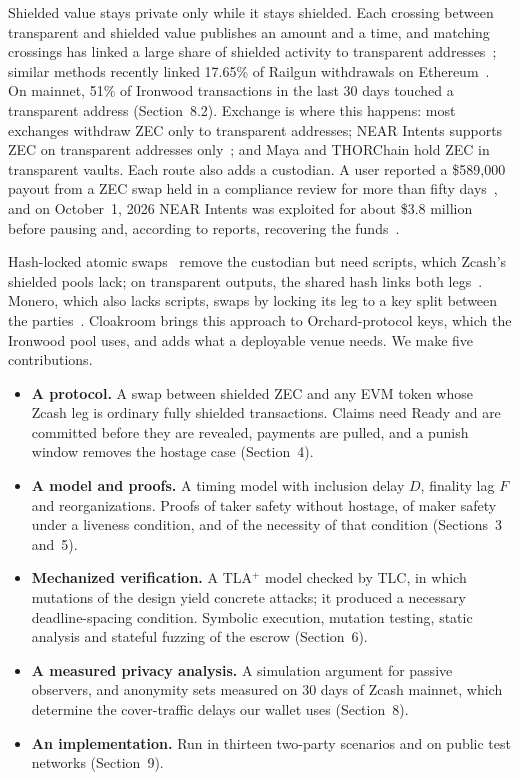 \documentclass[10pt,letterpaper]{article}
\theoremstyle{plain}
\theoremstyle{definition}
\begin{document}
Shielded value stays private only while it stays shielded. Each crossing between transparent
and shielded value publishes an amount and a time, and matching crossings has linked a large
share of shielded activity to transparent addresses~\cite{kappos,quesnelle,biryukov}; similar
methods recently linked 17.65\% of Railgun withdrawals on Ethereum~\cite{railgun}. On mainnet,
51\% of Ironwood transactions in the last 30 days touched a transparent address
(Section~8.2). Exchange is where this happens: most exchanges withdraw ZEC only to transparent
addresses; NEAR Intents supports ZEC on transparent addresses only~\cite{nearchains}; and Maya
and THORChain hold ZEC in transparent vaults. Each route also adds a custodian. A user reported
a \$589{,}000 payout from a ZEC swap held in a compliance review for more than fifty
days~\cite{freeze}, and on October~1, 2026 NEAR Intents was exploited for about \$3.8 million
before pausing and, according to reports, recovering the funds~\cite{nearexploit}.

Hash-locked atomic swaps~\cite{nolan,herlihy} remove the custodian but need scripts, which
Zcash's shielded pools lack; on transparent outputs, the shared hash links both legs~\cite{xcat}.
Monero, which also lacks scripts, swaps by locking its leg to a key split between the
parties~\cite{gugger,athanor}. Cloakroom brings this approach to Orchard-protocol keys, which the
Ironwood pool uses, and adds what a deployable venue needs. We make five contributions.
\begin{itemize}\setlength\itemsep{0.1em}
\item \textbf{A protocol.} A swap between shielded ZEC and any EVM token whose Zcash leg is
ordinary fully shielded transactions. Claims need Ready and are committed before they are
revealed, payments are pulled, and a punish window removes the hostage case
(Section~4).
\item \textbf{A model and proofs.} A timing model with inclusion delay $D$, finality lag $F$
and reorganizations. Proofs of taker safety without hostage, of maker safety under a liveness
condition, and of the necessity of that condition (Sections~3 and~5).
\item \textbf{Mechanized verification.} A TLA$^+$ model checked by TLC, in which mutations of the
design yield concrete attacks; it produced a necessary deadline-spacing condition. Symbolic
execution, mutation testing, static analysis and stateful fuzzing of the escrow (Section~6).
\item \textbf{A measured privacy analysis.} A simulation argument for passive observers, and
anonymity sets measured on 30 days of Zcash mainnet, which determine the cover-traffic delays our
wallet uses (Section~8).
\item \textbf{An implementation.} Run in thirteen two-party scenarios and on public test networks
(Section~9).
\end{itemize}
\end{document}
